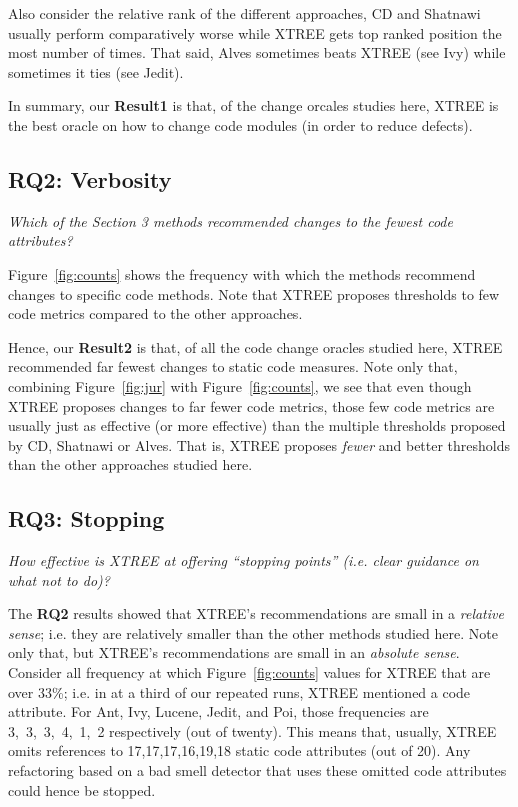 \documentclass[twocolumn,5p]{elsarticle}
\newcommand{\fig}[1]{Figure~\ref{fig:#1}}
\theoremstyle{break}
\begin{document}
\begin{itemize}
Also consider the relative
rank of the different approaches,
 CD and Shatnawi usually  perform comparatively worse while  XTREE gets top ranked position the most
number of times. That said, Alves sometimes beats XTREE (see Ivy)
while sometimes it ties (see Jedit).

In summary, our {\bf Result1} is  that, of the change orcales studies here,
XTREE is the best oracle on how to change code modules (in order to reduce defects).


 
 \subsection{RQ2: Verbosity}
 
 {\em Which of the Section 3 methods recommended changes to the fewest code attributes?}
 
\fig{counts} shows the frequency with which the methods
recommend changes to specific code methods.
Note that XTREE proposes thresholds to
few code metrics compared to the other approaches. 

% 

Hence, our {\bf Result2} is that, of all the code change oracles studied here, XTREE recommended far fewest changes to static code measures.
Note only that,   combining  \fig{jur} with \fig{counts}, we   see that
even though XTREE proposes changes to far fewer code metrics, those few
code metrics are usually just as effective (or
more effective) than the multiple
thresholds
proposed by CD, Shatnawi or Alves.  That is, XTREE proposes
{\em fewer} and better thresholds than the other approaches studied here.
 


\subsection{RQ3: Stopping}

{\em  How effective is XTREE at offering   “stopping points” (i.e. clear guidance on what not to do)?}

The {\bf RQ2} results showed that XTREE's recommendations are small in a {\em relative sense}; i.e. they are 
relatively smaller than the other methods studied here.
Note only that, but XTREE's recommendations are small in an {\em absolute sense}.
Consider all frequency at which  \fig{counts} values for XTREE that are over 33\%; i.e. in at a third of our  repeated runs, XTREE mentioned
a code attribute. For Ant, Ivy, Lucene, Jedit, and Poi, those frequencies
are  \mbox{3, 3, 3, 4, 1, 2} respectively (out of twenty). This means that, usually, XTREE omits references to \mbox{17,17,17,16,19,18} static
code attributes (out of 20). 
Any refactoring based on a bad smell detector that uses  these omitted code attributes could hence  be stopped.


\end{itemize}
\end{document}
